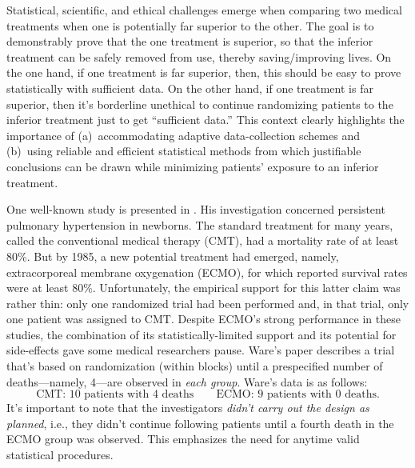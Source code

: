 \documentclass[a4paper, 12pt]{article}
\theoremstyle{plain}
\theoremstyle{definition}
\theoremstyle{remark}
\begin{document}
Statistical, scientific, and ethical challenges emerge when comparing two medical treatments when one is potentially far superior to the other.  The goal is to demonstrably prove that the one treatment is superior, so that the inferior treatment can be safely removed from use, thereby saving/improving lives.  On the one hand, if one treatment is far superior, then, this should be easy to prove statistically with sufficient data.  On the other hand, if one treatment is far superior, then it's borderline unethical
to continue randomizing patients to the inferior treatment just to get ``sufficient data.'' 
This context clearly highlights the importance of (a)~accommodating adaptive data-collection schemes and (b)~using reliable and efficient statistical methods from which justifiable conclusions can be drawn while minimizing patients' exposure to an inferior treatment.  

One well-known study is presented in \citet{ware1989}.  His investigation concerned persistent pulmonary hypertension in newborns.  The standard treatment for many years, called the conventional medical therapy (CMT), had a mortality rate of at least 80\%.  But by 1985, a new potential treatment had emerged, namely, extracorporeal membrane oxygenation (ECMO), for which reported survival rates were at least 80\%.  Unfortunately, the empirical support for this latter claim was rather thin: only one randomized trial had been performed and, in that trial, only one patient was assigned to CMT.  Despite ECMO's strong performance in these studies, the combination of its statistically-limited support and its potential for side-effects gave some medical researchers pause.  Ware's paper describes a trial that's based on randomization (within blocks) until a prespecified number of deaths---namely, 4---are observed in {\em each group}.  Ware's data is as follows:
\begin{equation}
\label{eq:ware.data}
\text{CMT: 10 patients with 4 deaths} \qquad \text{ECMO: 9 patients with 0 deaths}. 
\end{equation}
It's important to note that the investigators {\em didn't carry out the design as planned}, i.e., they didn't continue following patients until a fourth death in the ECMO group was observed.  This emphasizes the need for anytime valid statistical procedures. 
\end{document}
